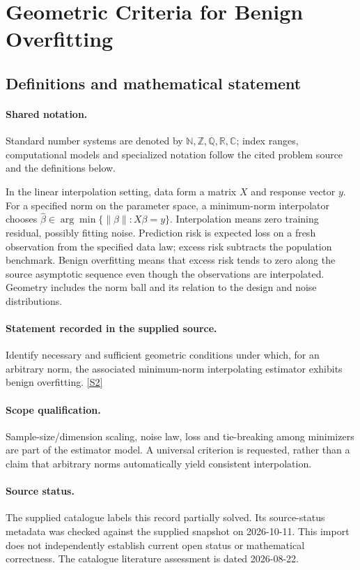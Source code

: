 \documentclass[11pt]{article}
\newcommand{\sref}[2]{\hyperlink{source:#1:#2}{[S#2]}}
\begin{document}
\section{Geometric Criteria for Benign Overfitting}\label{statement}

\subsection{Definitions and mathematical statement}

\paragraph{Shared notation.}Standard number systems are denoted by $\mathbb N,\mathbb Z,\mathbb Q,\mathbb R,\mathbb C$; index ranges, computational models and specialized notation follow the cited problem source and the definitions below.


In the linear interpolation setting, data form a matrix $X$ and response vector $y$. For a specified norm on the parameter space, a minimum-norm interpolator chooses $\widehat\beta\in\arg\min\{\lVert\beta\rVert:X\beta=y\}$. Interpolation means zero training residual, possibly fitting noise. Prediction risk is expected loss on a fresh observation from the specified data law; excess risk subtracts the population benchmark. Benign overfitting means that excess risk tends to zero along the source asymptotic sequence even though the observations are interpolated. Geometry includes the norm ball and its relation to the design and noise distributions.
\paragraph{Statement recorded in the supplied source.}
Identify necessary and sufficient geometric conditions under which, for an arbitrary norm, the associated minimum-norm interpolating estimator exhibits benign overfitting. \sref{statement}{2}
\paragraph{Scope qualification.}
Sample-size/dimension scaling, noise law, loss and tie-breaking among minimizers are part of the estimator model. A universal criterion is requested, rather than a claim that arbitrary norms automatically yield consistent interpolation.
\paragraph{Source status.}
The supplied catalogue labels this record partially solved. Its source-status metadata was checked against the supplied snapshot on 2026-10-11. This import does not independently establish current open status or mathematical correctness. The catalogue literature assessment is dated 2026-08-22.
\end{document}
